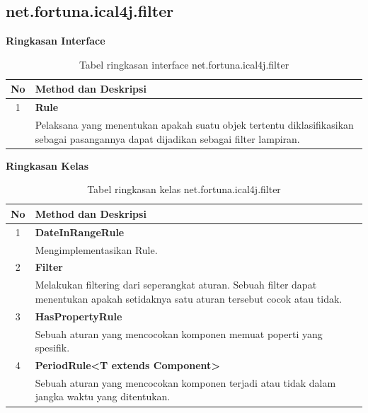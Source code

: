 \subsection{net.fortuna.ical4j.filter}
\label{subs:net.fortuna.ical4j.filter}
\noindent \textbf{Ringkasan Interface}\cite{ical}
\begin{table}[H]
		\centering
		\caption{Tabel ringkasan interface net.fortuna.ical4j.filter}
		\label{tab:net.fortuna.ical4j.filter}
	\begin{tabular}{|c|p{12cm}|}
		\hline
		\textbf{No} & \textbf{Method dan Deskripsi} \\ \hline \hline
		1 & \textbf{Rule}\\
			&	Pelaksana yang menentukan apakah suatu objek tertentu diklasifikasikan sebagai pasangannya dapat dijadikan sebagai filter lampiran.\\ \hline
	\end{tabular}
\end{table}

	\noindent \textbf{Ringkasan Kelas}\cite{ical}
	
	\begin{table}[H]
		\centering
		\caption{Tabel ringkasan kelas net.fortuna.ical4j.filter}
		\label{tab:kelas_net.fortuna.ical4j.filter}
	\begin{tabular}{|c|p{12cm}|}
		\hline
		\textbf{No} & \textbf{Method dan Deskripsi} \\ \hline \hline
		1 & \textbf{DateInRangeRule}\\
			&	Mengimplementasikan Rule.\\ \hline
		2 & \textbf{Filter}\\
			&	Melakukan filtering dari seperangkat aturan. Sebuah filter dapat menentukan apakah setidaknya satu aturan tersebut cocok atau tidak. \\ \hline
		3 & \textbf{HasPropertyRule}\\
			&	Sebuah aturan yang mencocokan komponen memuat poperti yang spesifik.\\ \hline
		4 & \textbf{PeriodRule<T extends Component>	
}\\
			&	Sebuah aturan yang mencocokan komponen terjadi atau tidak dalam jangka waktu yang ditentukan.\\ \hline
	\end{tabular}
\end{table}
	
